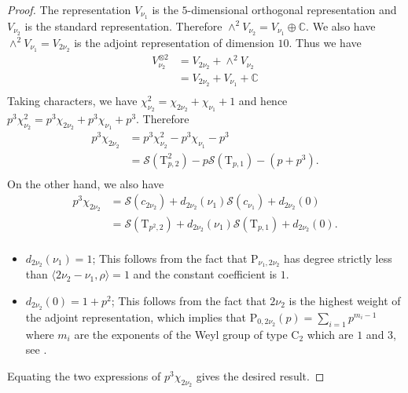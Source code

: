 \documentclass[10pt]{amsart}
\numberwithin{equation}{section}
\theoremstyle{definition}
\def\calS{\mathcal{S}}
\def\CC{\mathbb{C}}
\def\rmC{\mathrm{C}}
\def\rmP{\mathrm{P}}
\def\rmT{\mathrm{T}}
\begin{document}
\begin{proof}
The representation $V_{\nu_{1}}$ is the $5$-dimensional orthogonal representation and $V_{\nu_{2}}$ is the standard representation. Therefore $\wedge^{2} V_{\nu_{2}}=V_{\nu_{1}}\oplus \CC$. We also have $\wedge^{2}V_{\nu_{1}}=V_{2\nu_{2}}$ is the adjoint representation of dimension $10$. Thus we have
\begin{equation*}
\begin{aligned}
V^{\otimes 2}_{\nu_{2}}&=V_{2\nu_{2}}+\wedge^{2}V_{\nu_{2}}\\
&=V_{2\nu_{2}}+ V_{\nu_{1}}+\CC\\
\end{aligned}
\end{equation*}
Taking characters, we have $\chi^{2}_{\nu_{2}}=\chi_{2\nu_{2}}+\chi_{\nu_{1}}+1$ and hence $p^{3}\chi^{2}_{\nu_{2}}=p^{3}\chi_{2\nu_{2}}+p^{3}\chi_{\nu_{1}}+p^{3}$. Therefore
\begin{equation*}
\begin{aligned}
p^{3}\chi_{2\nu_{2}}&=p^{3}\chi^{2}_{\nu_{2}}-p^{3}\chi_{\nu_{1}}-p^{3}\\
&=\calS(\rmT^{2}_{p,2})-p\calS(\rmT_{p, 1})-(p+p^{3}).\\
\end{aligned}
\end{equation*}
On the other hand, we also have 
\begin{equation*}
\begin{aligned}
p^{3}\chi_{2\nu_{2}}&=\calS(c_{2\nu_{2}})+d_{2\nu_{2}}(\nu_{1})\calS(c_{\nu_{1}})+d_{2\nu_{2}}(0)\\
&=\calS(\rmT_{p^{2},2})+ d_{2\nu_{2}}(\nu_{1})\calS(\rmT_{p, 1})+d_{2\nu_{2}}(0).\\
\end{aligned}
\end{equation*} 
\begin{itemize}
\item $d_{2\nu_{2}}(\nu_{1})=1$; This follows from the fact that $\rmP_{\nu_{1}, 2\nu_{2}}$ has degree strictly less than $\langle2\nu_{2}-\nu_{1},\rho\rangle=1$ and the constant coefficient is $1$.
\item $d_{2\nu_{2}}(0)=1+p^{2}$; This follows from the fact that $2\nu_{2}$ is the highest weight of the adjoint representation, which implies that $\rmP_{0, 2\nu_{2}}(p)=\sum_{i=1}p^{m_{i}-1}$ where $m_{i}$ are the exponents of the Weyl group of type $\rmC_{2}$ which are $1$ and $3$, see \cite[4.6]{Gross-Satake}.
\end{itemize}
Equating the two expressions of $p^{3}\chi_{2\nu_{2}}$ gives the desired result.
\end{proof}
\end{document}
